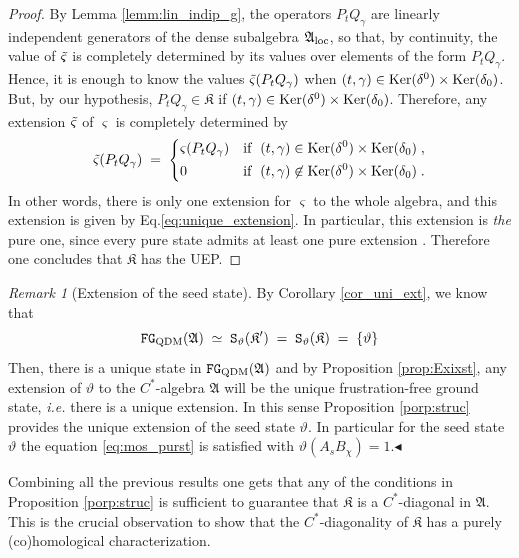 \documentclass[a4paper,12pt,twoside,reqno]{amsart}
\theoremstyle{plain}
\theoremstyle{definition}
\theoremstyle{remark}
\newtheorem{remark}[teo]{Remark}
\numberwithin{equation}{section}
\numberwithin{figure}{section}
\numberwithin{table}{section}
\begin{document}
\begin{proof}
		By Lemma \ref{lemm:lin_indip_g}, the operators $P_tQ_\gamma$ are linearly independent generators of the dense subalgebra $\mathfrak{A}_{\rm loc}$, so that, by continuity, the value of $\Tilde{\varsigma}$ is completely determined by its values over elements of the form $P_tQ_\gamma$. Hence, it is enough to know the values $\Tilde{\varsigma}(P_tQ_\gamma)$ when $(t,\gamma)\in {\rm Ker}(\delta^0)\times {\rm Ker}(\delta_0)$. But, by our hypothesis, $P_tQ_\gamma\in\mathfrak{K}$ if $(t,\gamma)\in {\rm Ker}(\delta^0)\times {\rm Ker}(\delta_0)$. Therefore, any extension $\Tilde{\varsigma}$ of $\varsigma$ is completely determined by
		\begin{equation}\label{eq:unique_extension}
			\Tilde{\varsigma}(P_tQ_\gamma)\;=\;
			\left\{
			\begin{aligned}
				&\varsigma(P_tQ_\gamma)&&{\rm if}\;\;(t,\gamma)\in {\rm Ker}(\delta^0)\times {\rm Ker}(\delta_0)\;,\\
				&0&&{\rm if}\;\;(t,\gamma)\not\in {\rm Ker}(\delta^0)\times {\rm Ker}(\delta_0)\;.
			\end{aligned}
			\right.
		\end{equation}
		In other words, there is only one extension for $\varsigma$ to the whole algebra, and this extension is given by Eq.\eqref{eq:unique_extension}. In particular, this extension is \emph{the} pure one, since every pure state admits at least one pure extension \cite[Proposition 2.3.24]{Bratelli}. Therefore one concludes that $\mathfrak{K}$ has the UEP.
	\end{proof}
	
	
	\begin{remark}[Extension of the  seed state]
		By Corollary \ref{cor_uni_ext}, we know that 
		\[
		\mathtt{FG}_{\rm QDM}(\mathfrak{A})\;\simeq\;\mathtt{S}_{\vartheta}(\mathfrak{K}')\;=\;\mathtt{S}_{\vartheta}(\mathfrak{K})\;=\;\{\vartheta\}
		\] Then, there is a unique state in $\mathtt{FG}_{\rm QDM}(\mathfrak{A})$ and by Proposition \ref{prop:Exixst}, any extension of $\vartheta$ to the $C^*$-algebra $\mathfrak{A}$ will be the unique frustration-free ground state, \emph{i.e.} there is a unique extension. In this sense Proposition \ref{porp:struc} provides the unique extension of the seed state $\vartheta$. In particular for the seed state $\vartheta$ the equation \eqref{eq:mos_purst} is satisfied with $\vartheta(A_sB_\chi)=1$.\hfill $\blacktriangleleft$
	\end{remark}
	
	
	\medskip
	
	Combining 
	all the previous results one gets that  any of the conditions in 
	Proposition \ref{porp:struc} is sufficient to guarantee that $\mathfrak{K}$  is a $C^*$-diagonal in $\mathfrak{A}$. This is the crucial observation to show that the $C^*$-diagonality of $\mathfrak{K}$  has a 
	purely (co)homological characterization.
	
\end{document}
